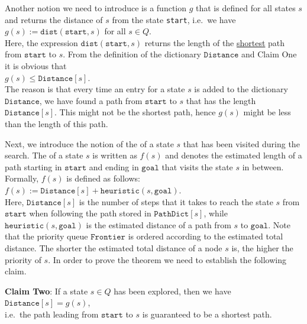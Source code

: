 Another notion we need to introduce is a function $g$ that is defined for all states $s$ and returns the
distance of $s$ from the state \texttt{start}, i.e.~we have
\\[0.2cm]
\hspace*{1.3cm}
$g(s) := \texttt{dist}(\texttt{start}, s)$ \quad for all $s \in Q$.
\\[0.2cm]
Here, the expression $\texttt{dist}(\texttt{start}, s)$ returns the length of the \underline{shortest} path from
$\texttt{start}$ to $s$.  From the definition of the dictionary $\texttt{Distance}$ and Claim One it is obvious that
\\[0.2cm]
\hspace*{1.3cm}
$g(s) \leq \texttt{Distance}[s]$.
\\[0.2cm]
The reason is that every time an entry for a state $s$ is added to the dictionary $\texttt{Distance}$, we have
found a path from $\texttt{start}$ to $s$ that has the length $\texttt{Distance}[s]$.  This might not be the
shortest path, hence $g(s)$ might be less than the length of this path.

Next, we introduce the notion of the  of a state $s$ that has been visited
during the search.  The  of a state $s$ is written as $f(s)$ and denotes the
estimated length of a path starting in $\texttt{start}$ and ending in $\texttt{goal}$ that visits the state $s$ in
between.  Formally, $f(s)$ is defined as follows:
\\[0.2cm]
\hspace*{1.3cm}
$f(s) := \texttt{Distance}[s] + \texttt{heuristic}(s, \mathtt{goal})$.
\\[0.2cm]
Here, $\texttt{Distance}[s]$ is the number of steps that it takes to reach the state $s$ from $\texttt{start}$
when following the path stored in $\mathtt{PathDict}[s]$,
while $\texttt{heuristic}(s, \mathtt{goal})$ is the estimated distance of a path from $s$ to $\texttt{goal}$.  Note that
the priority queue $\texttt{Frontier}$ is ordered according to the estimated total distance.
The shorter the estimated total distance of a node $s$ is, the higher the priority of $s$. 
In order to prove the theorem we need to establish the following claim.
\vspace*{0.2cm}

\noindent
\textbf{Claim Two}: If a state $s \in Q$ has been explored, then we have
\\[0.2cm]
\hspace*{1.3cm}
$\texttt{Distance}[s] = g(s)$,
\\[0.2cm]
i.e.~the path leading from $\texttt{start}$ to $s$ is guaranteed to be a shortest path.
\vspace*{0.2cm}


